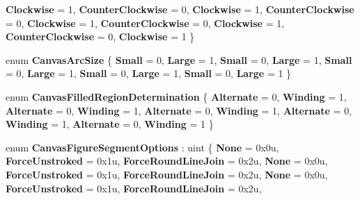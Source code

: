 \begin{DoxyCompactItemize}
{\bfseries Clockwise} = 1, 
{\bfseries Counter\+Clockwise} = 0, 
{\bfseries Clockwise} = 1, 
\newline
{\bfseries Counter\+Clockwise} = 0, 
{\bfseries Clockwise} = 1, 
{\bfseries Counter\+Clockwise} = 0, 
{\bfseries Clockwise} = 1, 
\newline
{\bfseries Counter\+Clockwise} = 0, 
{\bfseries Clockwise} = 1
 \}
\item 
\mbox{\label{namespace_microsoft_1_1_graphics_1_1_canvas_1_1_geometry_a583cc3265f037d53e69808d04a785d9a}} 
enum {\bfseries Canvas\+Arc\+Size} \{ \newline
{\bfseries Small} = 0, 
{\bfseries Large} = 1, 
{\bfseries Small} = 0, 
{\bfseries Large} = 1, 
\newline
{\bfseries Small} = 0, 
{\bfseries Large} = 1, 
{\bfseries Small} = 0, 
{\bfseries Large} = 1, 
\newline
{\bfseries Small} = 0, 
{\bfseries Large} = 1
 \}
\item 
\mbox{\label{namespace_microsoft_1_1_graphics_1_1_canvas_1_1_geometry_af9fb7e1db5b8bf2c9334f51491270043}} 
enum {\bfseries Canvas\+Filled\+Region\+Determination} \{ \newline
{\bfseries Alternate} = 0, 
{\bfseries Winding} = 1, 
{\bfseries Alternate} = 0, 
{\bfseries Winding} = 1, 
\newline
{\bfseries Alternate} = 0, 
{\bfseries Winding} = 1, 
{\bfseries Alternate} = 0, 
{\bfseries Winding} = 1, 
\newline
{\bfseries Alternate} = 0, 
{\bfseries Winding} = 1
 \}
\item 
\mbox{\label{namespace_microsoft_1_1_graphics_1_1_canvas_1_1_geometry_ada89e04bb167c7a96061368c1d6cc2ab}} 
enum {\bfseries Canvas\+Figure\+Segment\+Options} \+: uint \{ \newline
{\bfseries None} = 0x0u, 
{\bfseries Force\+Unstroked} = 0x1u, 
{\bfseries Force\+Round\+Line\+Join} = 0x2u, 
{\bfseries None} = 0x0u, 
\newline
{\bfseries Force\+Unstroked} = 0x1u, 
{\bfseries Force\+Round\+Line\+Join} = 0x2u, 
{\bfseries None} = 0x0u, 
{\bfseries Force\+Unstroked} = 0x1u, 
\newline
{\bfseries Force\+Round\+Line\+Join} = 0x2u, 

\end{DoxyCompactItemize}

